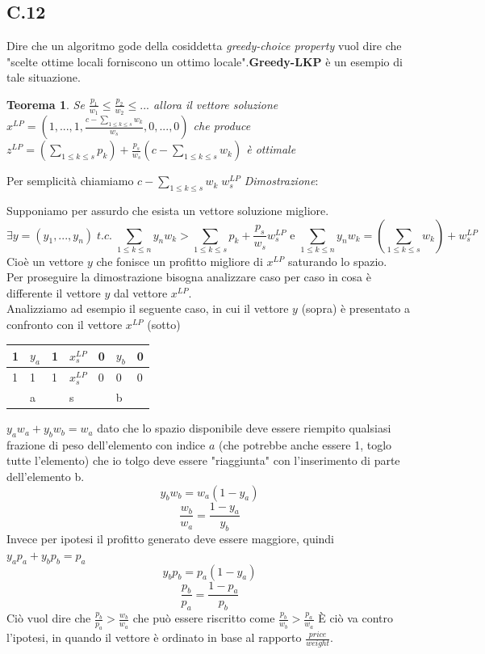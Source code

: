 \documentclass[a4paper]{article}
\newtheorem*{theorem}{Teorema}
\newenvironment{dimostrazione}{\textit{Dimostrazione}:\begin{adjustwidth}{1cm}{}}{\end{adjustwidth}}
\begin{document}
\subsection{C.12}
Dire che un algoritmo gode della cosiddetta \textit{greedy-choice property} vuol dire che "scelte ottime locali forniscono un ottimo locale".\textbf{Greedy-LKP} è un esempio di tale situazione.
\begin{theorem}
	Se $\frac{p_1}{w_1} \leq \frac{p_2}{w_2} \leq ...$ allora il vettore soluzione 
	$x^{LP}= (1, ... ,1,\frac{c- \sum_{1 \leq k \leq s}w_k}{w_s} ,0, ... ,0)$ che produce
	$z^{LP} = (\sum_{1 \leq k \leq s} p_k)+\frac{p_s}{w_s}(c- \sum_{1 \leq k \leq s}w_k)$ è ottimale 
\end{theorem}
Per semplicità chiamiamo $c- \sum_{1 \leq k \leq s}w_k \; w_s^{LP}$
\begin{dimostrazione}
	Supponiamo per assurdo che esista un vettore soluzione migliore.
	$$ \exists y =(y_1, ..., y_n) \; t.c. \; \sum_{1 \leq k \leq n}y_nw_k > \sum_{1 \leq k \leq s} p_k+\frac{p_s}{w_s}w_s^{LP} \text{ e }\sum_{1 \leq k \leq n}y_nw_k = (\sum_{1 \leq k \leq s}w_k)+ w_s^{LP}  $$
	Cioè un vettore $y$ che fonisce un profitto migliore di $x^{LP}$ saturando lo spazio.\\
	Per proseguire la dimostrazione bisogna analizzare caso per caso in cosa è differente il vettore $y$ dal vettore $x^{LP}$.\\
	Analizziamo ad esempio il seguente caso, in cui il vettore $y$ (sopra) è presentato a confronto con il vettore $x^{LP}$ (sotto)
	\begin{table}[!ht]
		\centering
\begin{tabular}{lllllll}
\hline
\multicolumn{1}{|l|}{1} & \multicolumn{1}{l|}{$y_a$} & \multicolumn{1}{l|}{1} & \multicolumn{1}{l|}{$x_s^{LP}$} & \multicolumn{1}{l|}{0} & \multicolumn{1}{l|}{$y_b$} & \multicolumn{1}{l|}{0} \\ \hline
\multicolumn{1}{|l|}{1} & \multicolumn{1}{l|}{1}    & \multicolumn{1}{l|}{1} & \multicolumn{1}{l|}{$x_s^{LP}$} & \multicolumn{1}{l|}{0} & \multicolumn{1}{l|}{0}    & \multicolumn{1}{l|}{0} \\ \hline
                        & a                         &                        & s                                                 &                        & b                         &                       
\end{tabular}
\end{table}
$y_aw_a +  y_bw_b = w_a$ dato che lo spazio disponibile deve essere riempito qualsiasi frazione di peso dell'elemento con indice $a$ (che potrebbe anche essere 1, toglo tutte l'elemento) che io tolgo deve essere "riaggiunta" con l'inserimento di parte dell'elemento b.
$$y_bw_b=w_a(1-y_a)$$
$$\frac{w_b}{w_a}=\frac{1-y_a}{y_b}$$
Invece per ipotesi il profitto generato deve essere maggiore, quindi $y_ap_a +  y_bp_b = p_a$
$$y_bp_b=p_a(1-y_a)$$
$$\frac{p_b}{p_a}=\frac{1-p_a}{p_b}$$
Ciò vuol dire che $\frac{p_b}{p_a} > \frac{w_b}{w_a}$ che può essere riscritto come $\frac{p_b}{w_b} > \frac{p_a}{w_a}$%
È ciò va contro l'ipotesi, in quando il vettore è ordinato in base al rapporto $\frac{price}{weight}$.
\end{dimostrazione}
\end{document}
